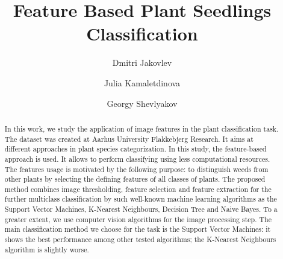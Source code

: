 \documentclass[runningheads]{llncs}
\begin{document}
%
\title{Feature Based Plant Seedlings Classification}
%
\author{Dmitri Jakovlev \and Julia Kamaletdinova \and Georgy Shevlyakov}
%
%

%
\maketitle              %
%
\begin{abstract}
    In this work, we study the application of image features in the plant classification task. The dataset was created at Aarhus University Flakkebjerg Research. It aims at different approaches in plant species categorization. In this study, the feature-based approach is used. It allows to perform classifying using less computational resources. The features usage is motivated by the following purpose: to distinguish weeds from other plants by selecting the defining features of all classes of plants. The proposed method combines image thresholding, feature selection and feature extraction for the further multiclass classification by such well-known machine learning algorithms as the Support Vector Machines, K-Nearest Neighbours, Decision Tree and Naive Bayes. To a greater extent, we use computer vision algorithms for the image processing step. The main classification method we choose for the task is the Support Vector Machines: it shows the best performance among other tested algorithms; the K-Nearest Neighbours algorithm is slightly worse.

\end{abstract}
%
%
%









%
%



\end{document}
